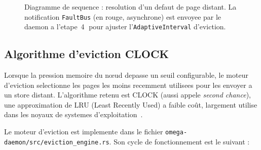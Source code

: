 \begin{figure}[htbp]
    \caption{Diagramme de sequence : resolution d'un defaut de page distant. La notification \texttt{FaultBus} (en rouge, asynchrone) est envoyee par le daemon a l'etape~\protect\textcircled{4} pour ajuster l'\texttt{AdaptiveInterval} d'eviction.}
    \label{fig:sequence-pagefault}
\end{figure}

\subsection{Algorithme d'eviction CLOCK}
\label{subsec:eviction-clock}

Lorsque la pression memoire du n\oe{}ud depasse un seuil configurable, le moteur d'eviction selectionne les pages les moins recemment utilisees pour les envoyer a un store distant. L'algorithme retenu est CLOCK (aussi appele \textit{second chance}), une approximation de LRU (Least Recently Used) a faible co\^ut, largement utilise dans les noyaux de systemes d'exploitation~\cite{tanenbaum_os}.

Le moteur d'eviction est implemente dans le fichier \texttt{omega-daemon/src/eviction\_engine.rs}. Son cycle de fonctionnement est le suivant :

